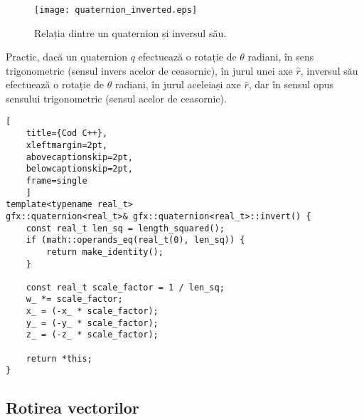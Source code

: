 \begin{figure}
\texttt{[image: quaternion\_inverted.eps]}
\caption{Relația dintre un quaternion și inversul său.}
\end{figure}

Practic, dacă un quaternion $q$ efectuează o rotație de $\theta$ radiani, 
în sens trigonometric (sensul invers acelor de ceasornic), în jurul unei axe 
$\hat{r}$, inversul său efectuează o rotație de $\theta$ radiani, în jurul 
aceleiași axe $\hat{r}$, dar în sensul opus sensului trigonometric (sensul 
acelor de ceasornic).

\begin{lstlisting}[
    title={Cod C++}, 
    xleftmargin=2pt,
    abovecaptionskip=2pt,
    belowcaptionskip=2pt,
    frame=single
    ]
template<typename real_t>
gfx::quaternion<real_t>& gfx::quaternion<real_t>::invert() {
    const real_t len_sq = length_squared();
    if (math::operands_eq(real_t(0), len_sq)) {
        return make_identity();
    }

    const real_t scale_factor = 1 / len_sq;
    w_ *= scale_factor;
    x_ = (-x_ * scale_factor);
    y_ = (-y_ * scale_factor);
    z_ = (-z_ * scale_factor);

    return *this;
}
\end{lstlisting}


\subsection{Rotirea vectorilor}
\label{ch1:quaternions:vector_rotation}
